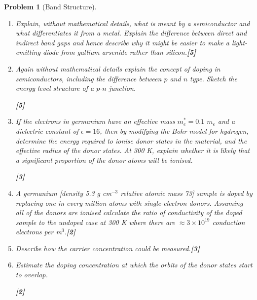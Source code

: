\documentclass[a4paper]{article}
\theoremstyle{new}
\newtheorem{qns}{Problem}[subsection]
\begin{document}
\begin{qns}[Band Structure]\leavevmode
\begin{enumerate}[label=(\roman*)]
\item Explain, without mathematical details, what is meant by a semiconductor and what differentiates it from a metal. Explain the difference between direct and indirect band gaps and hence describe why it might be easier to make a light-emitting diode from gallium arsenide rather than silicon.\hfill\textbf{[5]}
\item Again without mathematical details explain the concept of doping in semiconductors, including the difference between $p$ and $n$ type. Sketch the energy level structure of a $p$-$n$ junction.

\hfill\textbf{[5]}
\item If the electrons in germanium have an effective mass $m_e^*=0.1$ $m_e$ and a dielectric constant of $\epsilon=16$, then by modifying the Bohr model for hydrogen, determine the energy required to ionise donor states in the material, and the effective radius of the donor states. At 300 K, explain whether it is likely that a significant proportion of the donor atoms will be ionised.

\hfill\textbf{[3]}
\item A germanium [density 5.3 g cm$^{-3}$ relative atomic mass 73] sample is doped by replacing one in every million atoms with single-electron donors. Assuming all of the donors are ionised calculate the ratio of conductivity of the doped sample to the undoped case at 300 K where there are $\approx3\times10^{19}$ conduction electrons per m$^3$.\hfill\textbf{[2]}
\item Describe how the carrier concentration could be measured.\hfill\textbf{[3]}
\item Estimate the doping concentration at which the orbits of the donor states start to overlap.

\hfill\textbf{[2]}
\end{enumerate}
\begin{mdframed}
\end{mdframed}
\end{qns}
\end{document}
